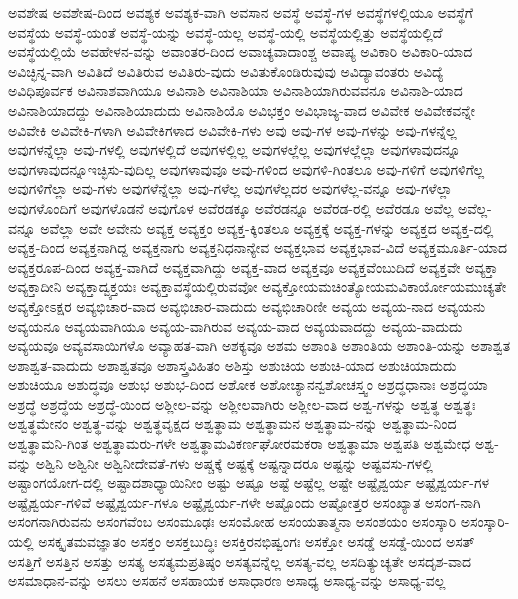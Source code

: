 {ಅವಶೇಷ
ಅವಶೇಷ-ದಿಂದ
ಅವಶ್ಯಕ
ಅವಶ್ಯಕ-ವಾಗಿ
ಅವಸಾನ
ಅವಸ್ಥೆ
ಅವಸ್ಥೆ-ಗಳ
ಅವಸ್ಥೆಗಳಲ್ಲಿಯೂ
ಅವಸ್ಥೆಗೆ
ಅವಸ್ಥೆಯ
ಅವಸ್ಥೆ-ಯಂತೆ
ಅವಸ್ಥೆ-ಯನ್ನು
ಅವಸ್ಥೆ-ಯಲ್ಲ
ಅವಸ್ಥೆ-ಯಲ್ಲಿ
ಅವಸ್ಥೆಯಲ್ಲಿತ್ತು
ಅವಸ್ಥೆಯಲ್ಲಿದೆ
ಅವಸ್ಥೆಯಲ್ಲಿಯೆ
ಅವಹೇಳನ-ವನ್ನು
ಅವಾಂತರ-ದಿಂದ
ಅವಾಚ್ಯವಾದಾಂಶ್ಚ
ಅವಾಪ್ಯ
ಅವಿಕಾರಿ
ಅವಿಕಾರಿ-ಯಾದ
ಅವಿಚ್ಛಿನ್ನ-ವಾಗಿ
ಅವಿತಿದೆ
ಅವಿತಿರುವ
ಅವಿತಿರು-ವುದು
ಅವಿತುಕೊಂಡಿರುವುವು
ಅವಿದ್ಯಾವಂತರು
ಅವಿದ್ಯೆ
ಅವಿಧಿಪೂರ್ವಕ
ಅವಿನಾಶವಾಗಿಯೂ
ಅವಿನಾಶಿ
ಅವಿನಾಶಿಯಾ
ಅವಿನಾಶಿಯಾಗಿರುವವನೂ
ಅವಿನಾಶಿ-ಯಾದ
ಅವಿನಾಶಿಯಾದದ್ದು
ಅವಿನಾಶಿಯಾದುದು
ಅವಿನಾಶಿಯೊ
ಅವಿಭಕ್ತಂ
ಅವಿಭಾಜ್ಯ-ವಾದ
ಅವಿವೇಕ
ಅವಿವೇಕವನ್ನೇ
ಅವಿವೇಕಿ
ಅವಿವೇಕಿ-ಗಳಾಗಿ
ಅವಿವೇಕಿಗಳಾದ
ಅವಿವೇಕಿ-ಗಳು
ಅವು
ಅವು-ಗಳ
ಅವು-ಗಳನ್ನು
ಅವು-ಗಳನ್ನೆಲ್ಲ
ಅವುಗಳನ್ನೆಲ್ಲಾ
ಅವು-ಗಳಲ್ಲಿ
ಅವುಗಳಲ್ಲಿದೆ
ಅವುಗಳಲ್ಲಿಲ್ಲ
ಅವುಗಳಲ್ಲೆಲ್ಲ
ಅವುಗಳಲ್ಲೆಲ್ಲಾ
ಅವುಗಳಾವುದನ್ನೂ
ಅವುಗಳಾವುದನ್ನೂಇಚ್ಛಿಸು-ವುದಿಲ್ಲ
ಅವುಗಳಾವುವೂ
ಅವು-ಗಳಿಂದ
ಅವುಗಳಿ-ಗಿಂತಲೂ
ಅವು-ಗಳಿಗೆ
ಅವುಗಳಿಗೆಲ್ಲ
ಅವುಗಳಿಗೆಲ್ಲಾ
ಅವು-ಗಳು
ಅವುಗಳೆನ್ನೆಲ್ಲಾ
ಅವು-ಗಳೆಲ್ಲ
ಅವುಗಳೆಲ್ಲದರ
ಅವುಗಳೆಲ್ಲ-ವನ್ನೂ
ಅವು-ಗಳೆಲ್ಲಾ
ಅವುಗಳೊಂದಿಗೆ
ಅವುಗಳೊಡನೆ
ಅವುಗೊಳ
ಅವೆರಡಕ್ಕೂ
ಅವೆರಡನ್ನೂ
ಅವೆರಡ-ರಲ್ಲಿ
ಅವೆರಡೂ
ಅವೆಲ್ಲ
ಅವೆಲ್ಲ-ವನ್ನೂ
ಅವೆಲ್ಲಾ
ಅವೇ
ಅವೇನು
ಅವ್ಯಕ್ತ
ಅವ್ಯಕ್ತಂ
ಅವ್ಯಕ್ತ-ಕ್ಕಿಂತಲೂ
ಅವ್ಯಕ್ತಕ್ಕೆ
ಅವ್ಯಕ್ತ-ಗಳನ್ನು
ಅವ್ಯಕ್ತದ
ಅವ್ಯಕ್ತ-ದಲ್ಲಿ
ಅವ್ಯಕ್ತ-ದಿಂದ
ಅವ್ಯಕ್ತನಾಗಿದ್ದ
ಅವ್ಯಕ್ತನಾಗು
ಅವ್ಯಕ್ತನಿಧನಾನ್ಯೇವ
ಅವ್ಯಕ್ತಭಾವ
ಅವ್ಯಕ್ತಭಾವ-ವಿದೆ
ಅವ್ಯಕ್ತಮೂರ್ತಿ-ಯಾದ
ಅವ್ಯಕ್ತರೂಪ-ದಿಂದ
ಅವ್ಯಕ್ತ-ವಾಗಿದೆ
ಅವ್ಯಕ್ತವಾಗಿದ್ದು
ಅವ್ಯಕ್ತ-ವಾದ
ಅವ್ಯಕ್ತವೂ
ಅವ್ಯಕ್ತವೆಂಬುದಿದೆ
ಅವ್ಯಕ್ತವೇ
ಅವ್ಯಕ್ತಾ
ಅವ್ಯಕ್ತಾದೀನಿ
ಅವ್ಯಕ್ತಾದ್ವ್ಯಕ್ತಯಃ
ಅವ್ಯಕ್ತಾವಸ್ಥೆಯಲ್ಲಿರುವವೋ
ಅವ್ಯಕ್ತೋಯಮಚಿಂತ್ಯೋಯಮವಿಕಾರ್ಯೋಯಮುಚ್ಯತೇ
ಅವ್ಯಕ್ತೋಽಕ್ಷರ
ಅವ್ಯಭಿಚಾರ-ವಾದ
ಅವ್ಯಭಿಚಾರ-ವಾದುದು
ಅವ್ಯಭಿಚಾರಿಣೀ
ಅವ್ಯಯ
ಅವ್ಯಯ-ನಾದ
ಅವ್ಯಯನು
ಅವ್ಯಯನೂ
ಅವ್ಯಯವಾಗಿಯೂ
ಅವ್ಯಯ-ವಾಗಿರುವ
ಅವ್ಯಯ-ವಾದ
ಅವ್ಯಯವಾದದ್ದು
ಅವ್ಯಯ-ವಾದುದು
ಅವ್ಯಯವೂ
ಅವ್ಯವಸಾಯಿಗಳೊ
ಅವ್ಯಾಹತ-ವಾಗಿ
ಅಶಕ್ಯವೂ
ಅಶಮ
ಅಶಾಂತಿ
ಅಶಾಂತಿಯ
ಅಶಾಂತಿ-ಯನ್ನು
ಅಶಾಶ್ವತ
ಅಶಾಶ್ವತ-ವಾದುದು
ಅಶಾಶ್ವತವೂ
ಅಶಾಸ್ತ್ರವಿಹಿತಂ
ಅಶಿಸ್ತು
ಅಶುಚಿಯ
ಅಶುಚಿ-ಯಾದ
ಅಶುಚಿಯಾದುದು
ಅಶುಚಿಯೂ
ಅಶುದ್ಧವೂ
ಅಶುಭ
ಅಶುಭ-ದಿಂದ
ಅಶೋಕ
ಅಶೋಚ್ಯಾನನ್ವಶೋಚಸ್ತ್ವಂ
ಅಶ್ರದ್ಧಧಾನಾಃ
ಅಶ್ರದ್ಧಯಾ
ಅಶ್ರದ್ಧೆ
ಅಶ್ರದ್ಧೆಯ
ಅಶ್ರದ್ಧೆ-ಯಿಂದ
ಅಶ್ಲೀಲ-ವನ್ನು
ಅಶ್ಲೀಲವಾಗಿರು
ಅಶ್ಲೀಲ-ವಾದ
ಅಶ್ವ-ಗಳನ್ನು
ಅಶ್ವತ್ಥ
ಅಶ್ವತ್ಥಃ
ಅಶ್ವತ್ಥಮೇನಂ
ಅಶ್ವತ್ಥ-ವನ್ನು
ಅಶ್ವತ್ಥವೃಕ್ಷದ
ಅಶ್ವತ್ಥಾಮ
ಅಶ್ವತ್ಥಾಮನ
ಅಶ್ವತ್ಥಾಮ-ನನ್ನು
ಅಶ್ವತ್ಥಾಮ-ನಿಂದ
ಅಶ್ವತ್ಥಾಮನಿ-ಗಿಂತ
ಅಶ್ವತ್ಥಾಮರು-ಗಳೇ
ಅಶ್ವತ್ಥಾಮವಿಕರ್ಣಘೋರಮಕರಾ
ಅಶ್ವತ್ಥಾಮಾ
ಅಶ್ವಪತಿ
ಅಶ್ವಮೇಧ
ಅಶ್ವ-ವನ್ನು
ಅಶ್ವಿನಿ
ಅಶ್ವಿನೀ
ಅಶ್ವಿನೀದೇವತೆ-ಗಳು
ಅಷ್ಚಕ್ಕೆ
ಅಷ್ಟಕ್ಕೆ
ಅಷ್ಟನ್ನಾದರೂ
ಅಷ್ಟನ್ನು
ಅಷ್ಟವಸು-ಗಳಲ್ಲಿ
ಅಷ್ಟಾಂಗಯೋಗ-ದಲ್ಲಿ
ಅಷ್ಟಾದಶಾಧ್ಯಾಯಿನೀಂ
ಅಷ್ಟು
ಅಷ್ಟೂ
ಅಷ್ಟೆ
ಅಷ್ಟೆಲ್ಲ
ಅಷ್ಟೇ
ಅಷ್ಟೈಶ್ವರ್ಯ
ಅಷ್ಟೈಶ್ವರ್ಯ-ಗಳ
ಅಷ್ಟೈಶ್ವರ್ಯ-ಗಳಿವೆ
ಅಷ್ಟೈಶ್ವರ್ಯ-ಗಳೂ
ಅಷ್ಟೈಶ್ವರ್ಯ-ಗಳೇ
ಅಷ್ಟೊಂದು
ಅಷ್ಟೋತ್ತರ
ಅಸಂಖ್ಯಾತ
ಅಸಂಗ-ನಾಗಿ
ಅಸಂಗನಾಗಿರುವನು
ಅಸಂಗವೆಂಬ
ಅಸಂಮೂಢಃ
ಅಸಂಮೋಹ
ಅಸಂಯತಾತ್ಮನಾ
ಅಸಂಶಯಂ
ಅಸಂಸ್ಕಾರಿ
ಅಸಂಸ್ಕಾರಿ-ಯಲ್ಲಿ
ಅಸಕ್ಕೃತಮವಜ್ಞಾತಂ
ಅಸಕ್ತಂ
ಅಸಕ್ತಬುದ್ಧಿಃ
ಅಸಕ್ತಿರನಭಿಷ್ವಂಗಃ
ಅಸಕ್ತೋ
ಅಸಡ್ಡೆ
ಅಸಡ್ಡೆ-ಯಿಂದ
ಅಸತ್
ಅಸತ್ತಿಗೆ
ಅಸತ್ತಿನ
ಅಸತ್ತು
ಅಸತ್ಯ
ಅಸತ್ಯಮಪ್ರತಿಷ್ಠಂ
ಅಸತ್ಯವನ್ನೆಲ್ಲ
ಅಸತ್ಯ-ವಲ್ಲ
ಅಸದಿತ್ಯುಚ್ಯತೇ
ಅಸದೃಶ-ವಾದ
ಅಸಮಾಧಾನ-ವನ್ನು
ಅಸಲು
ಅಸಹನೆ
ಅಸಹಾಯಕ
ಅಸಾಧಾರಣ
ಅಸಾಧ್ಯ
ಅಸಾಧ್ಯ-ವನ್ನು
ಅಸಾಧ್ಯ-ವಲ್ಲ
}
